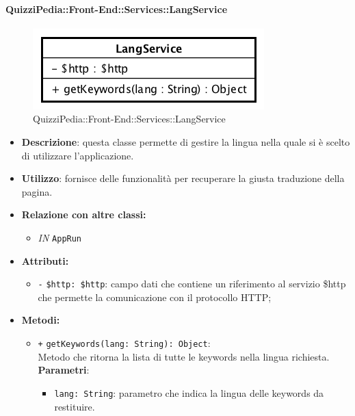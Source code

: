 \paragraph{QuizziPedia::Front-End::Services::LangService}
\begin{figure}[ht]
	\centering
	\includegraphics[scale=0.60]{UML/Classi/Front-End/QuizziPedia_Front-end_Services_LangService.png}
	\caption{QuizziPedia::Front-End::Services::LangService}
\end{figure}\FloatBarrier
\begin{itemize}
	\item \textbf{Descrizione}: questa classe permette di gestire la lingua nella quale si è scelto di utilizzare l'applicazione.
	\item \textbf{Utilizzo}: fornisce delle funzionalità per recuperare la giusta traduzione della pagina.
	\item \textbf{Relazione con altre classi:}
	\begin{itemize}
		\item \textit{IN} \texttt{AppRun}
	\end{itemize}
	\item \textbf{Attributi:}
	\begin{itemize}
		\item \texttt{-} \texttt{\$http: \$http}: campo dati che contiene un riferimento al servizio \$http che permette la comunicazione con il protocollo HTTP;
	\end{itemize}
	\item \textbf{Metodi:}
	\begin{itemize}
		\item \texttt{+} \texttt{getKeywords(lang: String): Object}: \\Metodo che ritorna la lista di tutte le keywords nella lingua richiesta.\\
		\textbf{Parametri}:
		\begin{itemize}
			\item \texttt{lang: String}: parametro che indica la lingua delle keywords da restituire.
		\end{itemize}
	\end{itemize}
\end{itemize}

